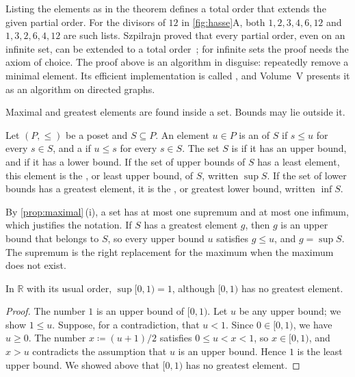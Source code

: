 Listing the elements as in the theorem defines a total order that extends the given partial order. For the divisors of $12$ in \cref{fig:hasse}A, both $1,2,3,4,6,12$ and $1,3,2,6,4,12$ are such lists. Szpilrajn proved that every partial order, even on an infinite set, can be extended to a total order~\cite{szpilrajn1930}; for infinite sets the proof needs the axiom of choice. The proof above is an algorithm in disguise: repeatedly remove a minimal element. Its efficient implementation is called , and Volume~V presents it as an algorithm on directed graphs.

Maximal and greatest elements are found inside a set. Bounds may lie outside it.

\begin{definition}
\label{def:sup}
Let $(P,\le)$ be a poset and $S\subseteq P$. An element $u\in P$ is an  of $S$ if $s\le u$ for every $s\in S$, and a  if $u\le s$ for every $s\in S$. The set $S$ is  if it has an upper bound, and  if it has a lower bound. If the set of upper bounds of $S$ has a least element, this element is the , or least upper bound, of $S$, written $\sup S$. If the set of lower bounds has a greatest element, it is the , or greatest lower bound, written $\inf S$.
\end{definition}

By \cref{prop:maximal}\,(i), a set has at most one supremum and at most one infimum, which justifies the notation. If $S$ has a greatest element $g$, then $g$ is an upper bound that belongs to $S$, so every upper bound $u$ satisfies $g\le u$, and $g=\sup S$. The supremum is the right replacement for the maximum when the maximum does not exist.

\begin{proposition}
\label{prop:sup-interval}
In $\mathbb R$ with its usual order, $\sup{[0,1)}=1$, although $[0,1)$ has no greatest element.
\end{proposition}

\begin{proof}
The number $1$ is an upper bound of $[0,1)$. Let $u$ be any upper bound; we show $1\le u$. Suppose, for a contradiction, that $u<1$. Since $0\in[0,1)$, we have $u\ge0$. The number $x\coloneqq(u+1)/2$ satisfies $0\le u<x<1$, so $x\in[0,1)$, and $x>u$ contradicts the assumption that $u$ is an upper bound. Hence $1$ is the least upper bound. We showed above that $[0,1)$ has no greatest element.
\end{proof}

